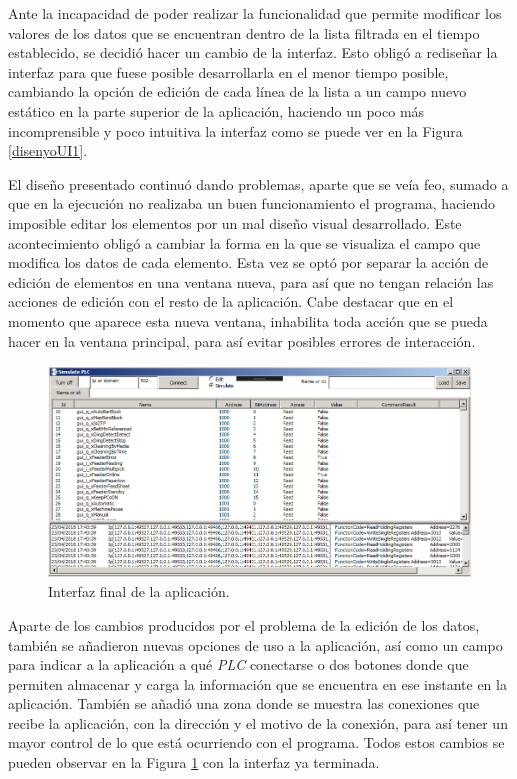 \documentclass[pdftex,11pt,a4paper]{book}
\begin{document}
Ante la incapacidad de poder realizar la funcionalidad que permite modificar los valores de los datos que se encuentran dentro de la lista filtrada en el tiempo establecido, se decidió hacer un cambio de la interfaz. Esto obligó a rediseñar la interfaz para que fuese posible desarrollarla en el menor tiempo posible, cambiando la opción de edición de cada línea de la lista a un campo nuevo estático en la parte superior de la aplicación, haciendo un poco más incomprensible y poco intuitiva la interfaz como se puede ver en la Figura \ref{disenyoUI1}.

El diseño presentado continuó dando problemas, aparte que se veía feo, sumado a que en la ejecución no realizaba un buen funcionamiento el programa, haciendo imposible editar los elementos por un mal diseño visual desarrollado. Este acontecimiento obligó a cambiar la forma en la que se visualiza el campo que modifica los datos de cada elemento. Esta vez se optó por separar la acción de edición de elementos en una ventana nueva, para así que no tengan relación las acciones de edición con el resto de la aplicación. Cabe destacar que en el momento que aparece esta nueva ventana, inhabilita toda acción que se pueda hacer en la ventana principal, para así evitar posibles errores de interacción.

\begin{figure}
\includegraphics[width=\textwidth]{img/disenyo_ui2.png}
\caption{\label{disenyoUI2}Interfaz final de la aplicación.}
\end{figure}

Aparte de los cambios producidos por el problema de la edición de los datos, también se añadieron nuevas opciones de uso a la aplicación, así como un campo para indicar a la aplicación a qué \emph{PLC} conectarse o dos botones donde que permiten almacenar y carga la información que se encuentra en ese instante en la aplicación. También se añadió una zona donde se muestra las conexiones que recibe la aplicación, con la dirección y el motivo de la conexión, para así tener un mayor control de lo que está ocurriendo con el programa. Todos estos cambios se pueden observar en la Figura \ref{disenyoUI2} con la interfaz ya terminada.
\end{document}
